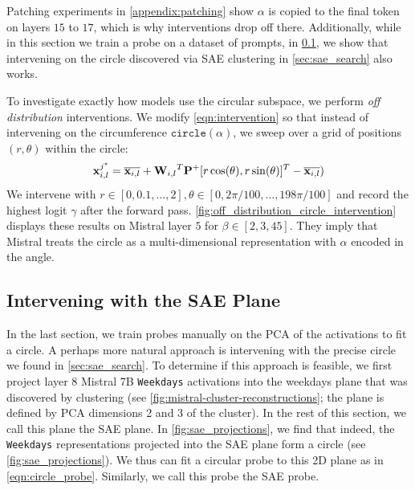 \documentclass{article} %
\DeclareRobustCommand{\revThree}[1]{#1}
\theoremstyle{plain}
\theoremstyle{definition}
\begin{document}
Patching experiments in \cref{appendix:patching} 
show $\alpha$ is copied to the final token on layers $15$ to $17$, which is why interventions drop off there. \revThree{Additionally, while in this section we train a probe on a dataset of prompts, in \cref{sec:intervening_with_sae}, we show that intervening on the circle discovered via SAE clustering in \cref{sec:sae_search} also works.}




To investigate exactly how models use the circular subspace, we perform \textit{off distribution} interventions. We modify \cref{eqn:intervention} so that instead of intervening on the circumference $\texttt{circle}(\alpha)$, we sweep over a grid of positions $(r, \theta)$ within the circle: 
\begin{align}
    \label{eqn:new_intervention}
    \mathbf{x}^{j^*}_{i, l} = \overline{{\bf x}_{i, l}} + {{\mathbf W}_{i, l}}^T{\mathbf P}^{+}[r\cos(\theta), r\sin(\theta)]^T - \overline{{\bf x}_{i, l}}) 
\end{align}
We intervene with $r \in [0, 0.1, \ldots, 2], \theta \in [0, 2 \pi / 100, \ldots, 198 \pi / 100]$ and record the highest logit $\gamma$ after the forward pass. \cref{fig:off_distribution_circle_intervention} displays these results on Mistral layer $5$ for $\beta \in [2, 3, 4 5]$. They imply that Mistral treats the circle as a multi-dimensional representation with $\alpha$ encoded in the angle. 

\subsection{Intervening with the SAE Plane}
\label{sec:intervening_with_sae}
In the last section, we train probes manually on the PCA of the activations to fit a circle. A perhaps more natural approach is intervening with the precise circle we found in \cref{sec:sae_search}. To determine if this approach is feasible, we first project layer 8 Mistral 7B \texttt{Weekdays} activations into the weekdays plane that was discovered by clustering (see \cref{fig:mistral-cluster-reconstructions}; the plane is defined by PCA dimensions 2 and 3 of the cluster). In the rest of this section, we call this plane the SAE plane. In \cref{fig:sae_projections}, we find that indeed, the \texttt{Weekdays} representations projected into the SAE plane form a circle (see \cref{fig:sae_projections}). We thus can fit a circular probe to this 2D plane as in \cref{eqn:circle_probe}. Similarly, we call this probe the SAE probe.
\end{document}
